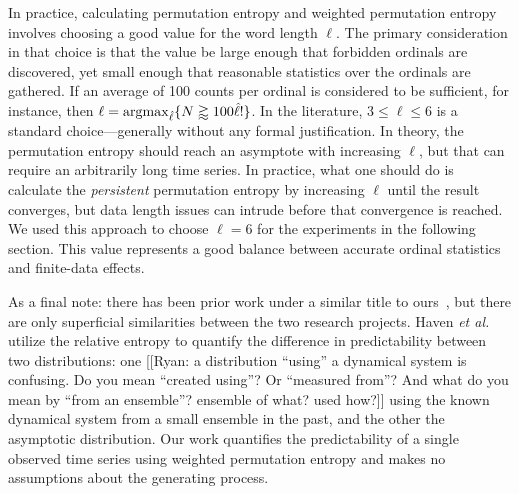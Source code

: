In practice, calculating permutation entropy and weighted permutation
entropy involves choosing a good value for the word length $\ell$. The
primary consideration in that choice is that the value be large enough
that forbidden ordinals are discovered, yet small enough that
reasonable statistics over the ordinals are gathered.  If an average
of 100 counts per ordinal is considered to be sufficient, for
instance, then $\ell = \operatornamewithlimits{argmax}_{\hat{\ell}} \{
N \gtrapprox 100 \hat{\ell}! \}$.  In the literature, $3 \le \ell \le
6$ is a standard choice---generally without any formal justification.
In theory, the permutation entropy should reach an asymptote with
increasing $\ell$, but that can require an arbitrarily long time
series. In practice, what one should do is calculate the
\emph{persistent} permutation entropy by increasing $\ell$ until the
result converges, but data length issues can intrude before that
convergence is reached.  We used this approach to choose $\ell = 6$
for the experiments in the following section.  This value represents a
good balance between accurate ordinal statistics and finite-data
effects.

As a final note: there has been prior work under a similar title to
ours~\cite{haven2005}, but there are only superficial similarities
between the two research projects.  Haven \emph{et al.} utilize the
relative entropy to quantify the difference in predictability between
two distributions: one {\color{red}[[Ryan: a distribution ``using'' a
      dynamical system is confusing.  Do you mean ``created using''?
      Or ``measured from''?  And what do you mean by ``from an
      ensemble''?  ensemble of what?  used how?]]}  using the known
dynamical system from a small ensemble in the past, and the other the
asymptotic distribution. Our work quantifies the predictability of a
single observed time series using weighted permutation entropy and
makes no assumptions about the generating process.


